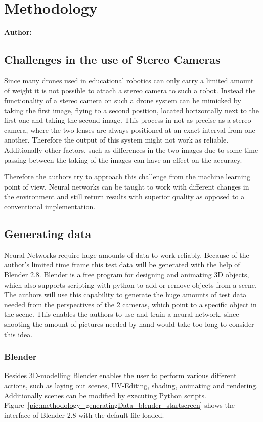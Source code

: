 \chapter{Methodology}

\textbf{Author: } 

\section{Challenges in the use of Stereo Cameras}
Since many drones used in educational robotics can only carry a limited amount of weight it is not possible to attach a stereo camera to such a robot. Instead the functionality of a stereo camera on such a drone system can be mimicked by taking the first image, flying to a second position, located horizontally next to the first one and taking the second image. This process in not as precise as a stereo camera, where the two lenses are always positioned at an exact interval from one another. Therefore the output of this system might not work as reliable. Additionally other factors, such as differences in the two images due to some time passing between the taking of the images can have an effect on the accuracy.

Therefore the authors try to approach this challenge from the machine learning point of view. Neural networks can be taught to work with different changes in the environment and still return results with superior quality as opposed to a conventional implementation.

\section{Generating data}
Neural Networks require huge amounts of data to work reliably. Because of the author's limited time frame this test data will be generated with the help of Blender 2.8. Blender is a free program for designing and animating 3D objects, which also supports scripting with python to add or remove objects from a scene. The authors will use this capability to generate the huge amounts of test data needed from the perspectives of the 2 cameras, which point to a specific object in the scene. This enables the authors to use and train a neural network, since shooting the amount of pictures needed by hand would take too long to consider this idea. 

\subsection{Blender}
Besides 3D-modelling Blender enables the user to perform various different actions, such as laying out scenes, UV-Editing, shading, animating and rendering. Additionally scenes can be modified by executing Python scripts. Figure~\ref{pic:methodology_generatingData_blender_startscreen} shows the interface of Blender 2.8 with the default file loaded.

